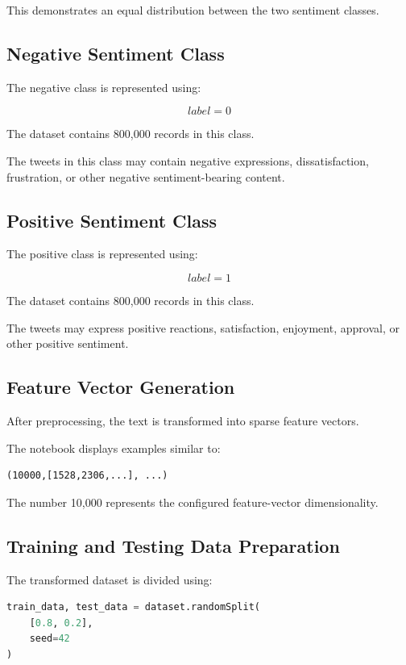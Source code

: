 \documentclass[12pt,a4paper]{article}
\begin{document}
This demonstrates an equal distribution between the two sentiment classes.

\subsection{Negative Sentiment Class}

The negative class is represented using:

\[
label=0
\]

The dataset contains 800,000 records in this class.

The tweets in this class may contain negative expressions, dissatisfaction, frustration, or other negative sentiment-bearing content.

\subsection{Positive Sentiment Class}

The positive class is represented using:

\[
label=1
\]

The dataset contains 800,000 records in this class.

The tweets may express positive reactions, satisfaction, enjoyment, approval, or other positive sentiment.



\subsection{Feature Vector Generation}

After preprocessing, the text is transformed into sparse feature vectors.

The notebook displays examples similar to:

\begin{lstlisting}
(10000,[1528,2306,...], ...)
\end{lstlisting}

The number 10,000 represents the configured feature-vector dimensionality.

\subsection{Training and Testing Data Preparation}

The transformed dataset is divided using:

\begin{lstlisting}[language=Python]
train_data, test_data = dataset.randomSplit(
    [0.8, 0.2],
    seed=42
)
\end{lstlisting}
\end{document}
